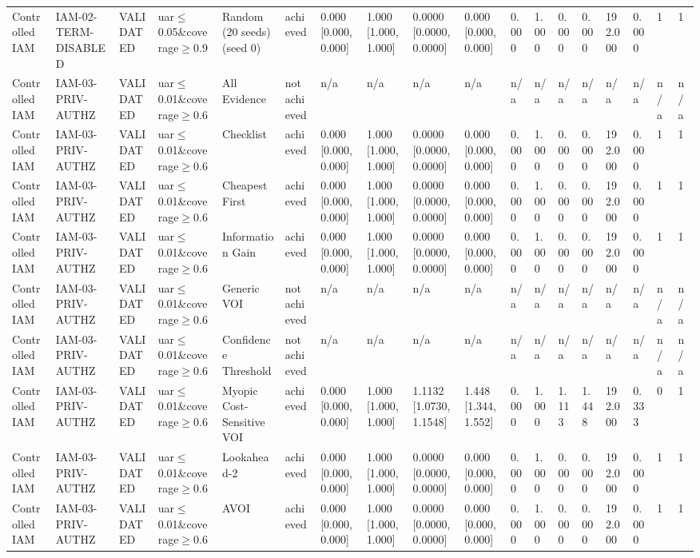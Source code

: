 \begin{table}[!ht]
{\begin{tabular}{llllllllllllllllll}
Controlled IAM & IAM-02-TERM-DISABLED & VALIDATED & uar$\le$0.05\&coverage$\ge$0.9 & Random (20 seeds) (seed 0) & achieved & 0.000 [0.000, 0.000] & 1.000 [1.000, 1.000] & 0.0000 [0.0000, 0.0000] & 0.000 [0.000, 0.000] & 0.000 & 1.000 & 0.000 & 0.000 & 192.000 & 0.000 & 1 & 1 \\
Controlled IAM & IAM-03-PRIV-AUTHZ & VALIDATED & uar$\le$0.01\&coverage$\ge$0.6 & All Evidence & not achieved & n/a & n/a & n/a & n/a & n/a & n/a & n/a & n/a & n/a & n/a & n/a & n/a \\
Controlled IAM & IAM-03-PRIV-AUTHZ & VALIDATED & uar$\le$0.01\&coverage$\ge$0.6 & Checklist & achieved & 0.000 [0.000, 0.000] & 1.000 [1.000, 1.000] & 0.0000 [0.0000, 0.0000] & 0.000 [0.000, 0.000] & 0.000 & 1.000 & 0.000 & 0.000 & 192.000 & 0.000 & 1 & 1 \\
Controlled IAM & IAM-03-PRIV-AUTHZ & VALIDATED & uar$\le$0.01\&coverage$\ge$0.6 & Cheapest First & achieved & 0.000 [0.000, 0.000] & 1.000 [1.000, 1.000] & 0.0000 [0.0000, 0.0000] & 0.000 [0.000, 0.000] & 0.000 & 1.000 & 0.000 & 0.000 & 192.000 & 0.000 & 1 & 1 \\
Controlled IAM & IAM-03-PRIV-AUTHZ & VALIDATED & uar$\le$0.01\&coverage$\ge$0.6 & Information Gain & achieved & 0.000 [0.000, 0.000] & 1.000 [1.000, 1.000] & 0.0000 [0.0000, 0.0000] & 0.000 [0.000, 0.000] & 0.000 & 1.000 & 0.000 & 0.000 & 192.000 & 0.000 & 1 & 1 \\
Controlled IAM & IAM-03-PRIV-AUTHZ & VALIDATED & uar$\le$0.01\&coverage$\ge$0.6 & Generic VOI & not achieved & n/a & n/a & n/a & n/a & n/a & n/a & n/a & n/a & n/a & n/a & n/a & n/a \\
Controlled IAM & IAM-03-PRIV-AUTHZ & VALIDATED & uar$\le$0.01\&coverage$\ge$0.6 & Confidence Threshold & not achieved & n/a & n/a & n/a & n/a & n/a & n/a & n/a & n/a & n/a & n/a & n/a & n/a \\
Controlled IAM & IAM-03-PRIV-AUTHZ & VALIDATED & uar$\le$0.01\&coverage$\ge$0.6 & Myopic Cost-Sensitive VOI & achieved & 0.000 [0.000, 0.000] & 1.000 [1.000, 1.000] & 1.1132 [1.0730, 1.1548] & 1.448 [1.344, 1.552] & 0.000 & 1.000 & 1.113 & 1.448 & 192.000 & 0.333 & 0 & 1 \\
Controlled IAM & IAM-03-PRIV-AUTHZ & VALIDATED & uar$\le$0.01\&coverage$\ge$0.6 & Lookahead-2 & achieved & 0.000 [0.000, 0.000] & 1.000 [1.000, 1.000] & 0.0000 [0.0000, 0.0000] & 0.000 [0.000, 0.000] & 0.000 & 1.000 & 0.000 & 0.000 & 192.000 & 0.000 & 1 & 1 \\
Controlled IAM & IAM-03-PRIV-AUTHZ & VALIDATED & uar$\le$0.01\&coverage$\ge$0.6 & AVOI & achieved & 0.000 [0.000, 0.000] & 1.000 [1.000, 1.000] & 0.0000 [0.0000, 0.0000] & 0.000 [0.000, 0.000] & 0.000 & 1.000 & 0.000 & 0.000 & 192.000 & 0.000 & 1 & 1 \\

\end{tabular}}
\end{table}
